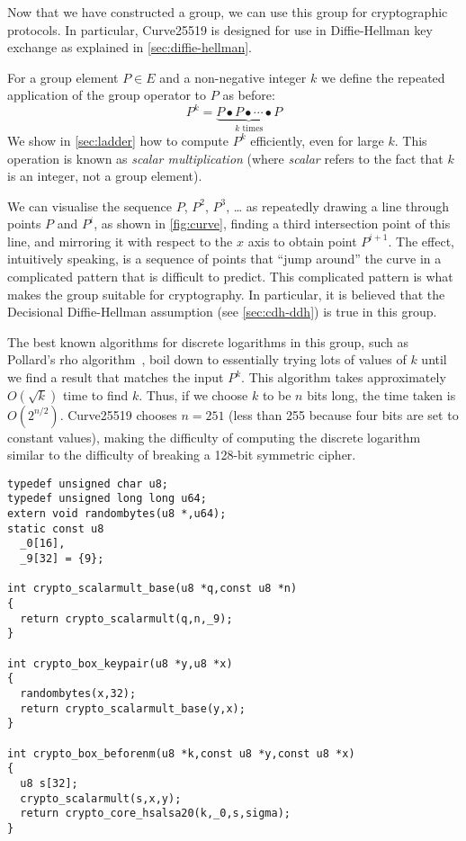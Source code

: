 \documentclass{article}
\begin{document}
Now that we have constructed a group, we can use this group for cryptographic protocols.
In particular, Curve25519 is designed for use in Diffie-Hellman key exchange as explained in \autoref{sec:diffie-hellman}.

For a group element $P \in E$ and a non-negative integer $k$ we define the repeated application of the group operator to $P$ as before:
\begin{equation}
P^k = \underbrace{P \bullet P \bullet \cdots \bullet P}_\text{$k$ times}
\end{equation}
We show in \autoref{sec:ladder} how to compute $P^k$ efficiently, even for large $k$.
This operation is known as \emph{scalar multiplication} (where \emph{scalar} refers to the fact that $k$ is an integer, not a group element).

We can visualise the sequence $P$, $P^2$, $P^3$, {\dots} as repeatedly drawing a line through points $P$ and $P^i$, as shown in \autoref{fig:curve}, finding a third intersection point of this line, and mirroring it with respect to the $x$ axis to obtain point $P^{i+1}$.
The effect, intuitively speaking, is a sequence of points that ``jump around'' the curve in a complicated pattern that is difficult to predict.
This complicated pattern is what makes the group suitable for cryptography.
In particular, it is believed that the Decisional Diffie-Hellman assumption (see \autoref{sec:cdh-ddh}) is true in this group.

The best known algorithms for discrete logarithms in this group, such as Pollard's rho algorithm~\cite{Pollard:1978do}, boil down to essentially trying lots of values of $k$ until we find a result that matches the input $P^k$.
This algorithm takes approximately $O(\sqrt{k})$ time to find $k$.
Thus, if we choose $k$ to be $n$ bits long, the time taken is $O(2^{n/2})$.
Curve25519 chooses $n=251$ (less than 255 because four bits are set to constant values), making the difficulty of computing the discrete logarithm similar to the difficulty of breaking a 128-bit symmetric cipher.

\begin{listing}
\begin{verbatim}
typedef unsigned char u8;
typedef unsigned long long u64;
extern void randombytes(u8 *,u64);
static const u8
  _0[16],
  _9[32] = {9};

int crypto_scalarmult_base(u8 *q,const u8 *n)
{ 
  return crypto_scalarmult(q,n,_9);
}

int crypto_box_keypair(u8 *y,u8 *x)
{
  randombytes(x,32);
  return crypto_scalarmult_base(y,x);
}

int crypto_box_beforenm(u8 *k,const u8 *y,const u8 *x)
{
  u8 s[32];
  crypto_scalarmult(s,x,y);
  return crypto_core_hsalsa20(k,_0,s,sigma);
}
\end{verbatim}
\caption{Using the \texttt{crypto{\PYGZus}scalarmult} function to implement Diffie-Hellman in TweetNaCl}\label{code:diffie-hellman}
\end{listing}
\end{document}
